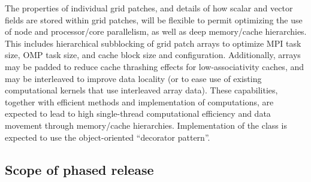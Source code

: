 \documentclass[11pt]{article}
\begin{document}

    The properties of individual grid patches, and details of how
    scalar and vector fields are stored within grid patches, will be
    flexible to permit optimizing the use of node and processor/core
    parallelism, as well as deep memory/cache hierarchies.  This
    includes hierarchical subblocking of grid patch arrays to optimize
    MPI task size, OMP task size, and cache block size and
    configuration.  Additionally, arrays may be padded to reduce cache
    thrashing effects for low-associativity caches, and may be
    interleaved to improve data locality (or to ease use of existing
    computational kernels that use interleaved array data).  These
    capabilities, together with efficient methods and implementation
    of computations, are expected to lead to high single-thread
    computational efficiency and data movement through memory/cache
    hierarchies.  Implementation of the  class is expected
    to use the object-oriented ``decorator pattern''.




\subsection{Scope of phased release}



\end{document}
